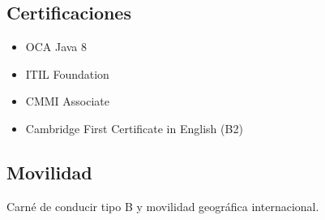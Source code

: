 \documentclass[letterpaper]{twentysecondcv} %
\begin{document}
\subsection{Certificaciones}
\begin{itemize}
\item OCA Java 8
\item ITIL Foundation
\item CMMI Associate
\item Cambridge First Certificate in English (B2)
\end{itemize}
\subsection{Movilidad}
Carné de conducir tipo B y movilidad geográfica internacional.







\end{document}
